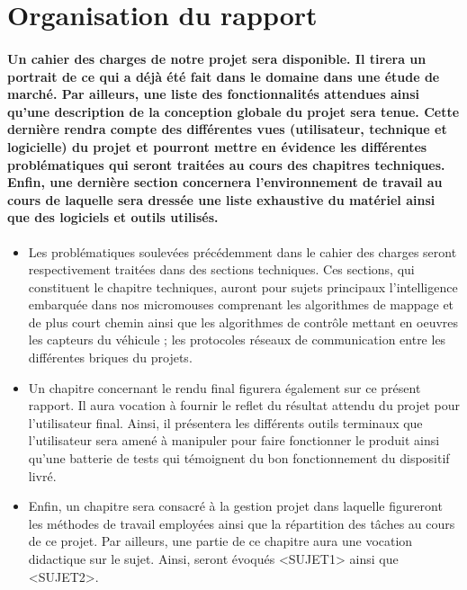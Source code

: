 \section{Organisation du rapport} \label{sec:organisation}

\paragraph{
	Un cahier des charges de notre projet sera disponible. Il tirera un portrait 
de ce qui a déjà été fait dans le domaine dans une étude de marché. Par ailleurs, 
une liste des fonctionnalités attendues ainsi qu'une description de la conception 
globale du projet sera tenue. Cette dernière rendra compte des différentes vues 
(utilisateur, technique et logicielle) du projet et pourront mettre en évidence les 
différentes problématiques qui seront traitées au cours des chapitres techniques. 
Enfin, une dernière section concernera l'environnement de travail au cours de laquelle 
sera dressée une liste exhaustive du matériel ainsi que des logiciels et outils utilisés.}

\vspace{5mm}
\begin{itemize}
	\item Les problématiques soulevées précédemment dans le cahier des charges seront 
respectivement traitées dans des sections techniques. Ces sections, qui constituent 
le chapitre techniques, auront pour sujets principaux l'intelligence embarquée dans 
nos micromouses comprenant les algorithmes de mappage et de plus court chemin ainsi 
que les algorithmes de contrôle mettant en oeuvres les capteurs du véhicule ; les protocoles 
réseaux de communication entre les différentes briques du projets. \\


	\item Un chapitre concernant le rendu final figurera également sur ce présent rapport. 
Il aura vocation à fournir le reflet du résultat attendu du projet pour l'utilisateur 
final. Ainsi, il présentera les différents outils terminaux que l'utilisateur sera amené 
à manipuler pour faire fonctionner le produit ainsi qu'une batterie de tests qui témoignent 
du bon fonctionnement du dispositif livré. \\


	\item Enfin, un chapitre sera consacré à la gestion projet dans laquelle figureront les méthodes 
de travail employées ainsi que la répartition des tâches au cours de ce projet. 
Par ailleurs, une partie de ce chapitre aura une vocation didactique sur le sujet. 
Ainsi, seront évoqués <SUJET1> ainsi que <SUJET2>. \\
\end{itemize}